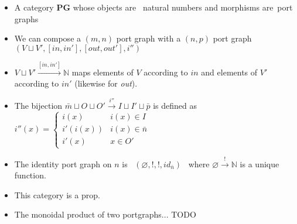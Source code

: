 \begin{itemize}
    \item A category \textbf{PG} whose objects are \, natural numbers and morphisms are \,port graphs \,
    \item We can compose a $(m,n)$ port graph with a $(n, p)$ port graph $(V \sqcup V',[in,in'],[out,out'], i'')$
    \item $V \sqcup V' \xrightarrow{[in,in']} \mathbb{N}$ maps elements of $V$ according to $in$ and elements of $V'$ according to $in'$ (likewise for \emph{out}).
    \item  The bijection $\bar m \sqcup O \sqcup O' \xrightarrow{i''} I \sqcup I' \sqcup \bar p$ is defined as \, $i''(x)=\begin{cases}i(x) & i(x) \in I \\ i'(i(x))& i(x) \in \bar n \\ i'(x) & x \in O' \end{cases}$ \,
    \item The identity port graph on $n$ is \, $(\varnothing, !, !, id_{\bar n})$ \, where $\varnothing \xrightarrow{!} \mathbb{N}$ is a unique function.
    \item This category is a prop.
    \item The monoidal product of two portgraphs... TODO
  \end{itemize}